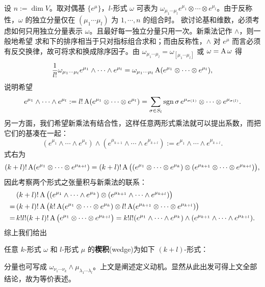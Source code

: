 设 $n:=\dim V$。取对偶基 $\{e^\mu\}$，$l$-形式 $\omega$ 可表为 $\omega_{\mu_1\cdots\mu_l} e^{\mu_1}\otimes\cdots\otimes e^{\mu_l}$。由于反称性，$\omega$ 的独立分量仅在 $(\mu_1\cdots\mu_l)$ 为 $1,\cdots,n$ 的组合时。
欲讨论基和维数，必须考虑如何只用独立分量表示 $\omega$。且最好每一独立分量只用一次。新乘法记作 $\wedge$，则一般地希望
求和下的排序相当于只对指标组合求和；而由反称性，$\wedge$ 对 $e^\mu$ 而言必须有反交换律，故可将求和换成除序因子。由 $\omega_{\mu_1\cdots\mu_l}=\omega_{[\mu_1\cdots\mu_l]}$ 或 $\omega=\operatorname{A}\omega$ 得
\[
    \frac{1}{l!}\omega_{\mu_1\cdots\mu_l} e^{\mu_1}\wedge\cdots\wedge e^{\mu_l}=\omega_{\mu_1\cdots\mu_l} \operatorname{A}(e^{\mu_1}\otimes\cdots\otimes e^{\mu_l}),
\]
说明希望
\[e^{\mu_{1}}\wedge\cdots\wedge e^{\mu_{l}}:=l!\operatorname{A}(e^{\mu_1}\otimes\cdots\otimes e^{\mu_l})=\sum_{\sigma\in S_l}\operatorname{sgn}\sigma\, e^{\mu_{\sigma(1)}}\otimes\cdots\otimes e^{\mu_{\sigma(l)}}.\]
另一方面，我们希望新乘法有结合性，这样任意两形式乘法就可以提出系数，而把它们的基凑在一起：
\[(e^{\mu_{1}}\wedge\cdots\wedge e^{\mu_{k}})\wedge( e^{\mu_{k+1}}\wedge\cdots\wedge e^{\mu_{k+l}}):= e^{\mu_{1}}\wedge\cdots\wedge e^{\mu_{k+l}}.\]
式右为
\[
(k+l)!\operatorname{A}( e^{\mu_{1}}\otimes\cdots\otimes e^{\mu_{k+l}})=(k+l)!\operatorname{A}\big(( e^{\mu_{1}}\otimes\cdots\otimes e^{\mu_{k}})\otimes( e^{\mu_{k+1}}\otimes\cdots\otimes e^{\mu_{k+l}})\big),
\]
因此考察两个形式之张量积与新乘法的联系：
\begin{align*}
    &(k+l)!\operatorname{A}\big(( e^{\mu_{1}}\wedge\cdots\wedge e^{\mu_{k}})\otimes( e^{\mu_{k+1}}\wedge\cdots\wedge e^{\mu_{k+l}})\big)\\
    =\,&(k+l)!\operatorname{A}\big(k!\operatorname{A}( e^{\mu_{1}}\otimes\cdots\otimes e^{\mu_{k}})\otimes l!\operatorname{A}( e^{\mu_{k+1}}\otimes\cdots\otimes e^{\mu_{k+l}})\big)\\
    =\,& k!l!(k+l)!\operatorname{A}\big(e^{\mu_{1}}\otimes\cdots\otimes e^{\mu_{k+l}}\big)=k!l!( e^{\mu_{1}}\wedge\cdots\wedge e^{\mu_{k}})\wedge( e^{\mu_{k+1}}\wedge\cdots\wedge e^{\mu_{k+l}}).
\end{align*}
综上我们给出
\begin{definition}
    任意 $k$-形式 $\omega$ 和 $l$-形式 $\mu$ 的\textbf{楔积}(wedge)为如下 $(k+l)$-形式：
\end{definition}
\begin{remark}
    分量也可写成 $\omega_{\nu_1\cdots\nu_k}\wedge\mu_{\lambda_1\cdots\lambda_l}$。上文是阐述定义动机。显然从此出发可得上文全部结论，故为等价表述。
\end{remark}

